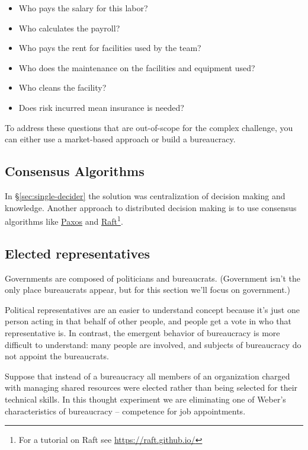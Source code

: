 \begin{itemize}
    \item Who pays the salary for this labor?
    \item Who calculates the payroll?
    \item Who pays the rent for facilities used by the team?
    \item Who does the maintenance on the facilities and equipment used?
    \item Who cleans the facility?
    \item Does risk incurred mean insurance is needed?
\end{itemize}
To address these questions that are out-of-scope for the complex challenge, you can either use a market-based approach or build a bureaucracy. 

\subsection{Consensus Algorithms}

In \S\ref{sec:single-decider} the solution was centralization of decision making and knowledge. Another approach to distributed decision making is to use consensus algorithms like \href{https://en.wikipedia.org/wiki/Paxos_(computer_science)}{Paxos} and \href{https://en.wikipedia.org/wiki/Raft_(algorithm)}{Raft}\footnote{For a tutorial on Raft see \href{https://raft.github.io/}{https://raft.github.io/}}.


\subsection{Elected representatives}
Governments are composed of politicians and bureaucrats. (Government isn't the only place bureaucrats appear, but for this section we'll focus on government.)

Political representatives are an easier to understand concept because it's just one person acting in that behalf of other people, and people get a vote in who that representative is.
In contrast, the emergent behavior of bureaucracy is more difficult to understand: many people are involved, and subjects of bureaucracy do not appoint the bureaucrats. 

Suppose that instead of a bureaucracy all members of an organization charged with managing shared resources were elected rather than being selected for their technical skills. In this thought experiment we are eliminating one of Weber's characteristics of bureaucracy -- competence for job appointments. 

